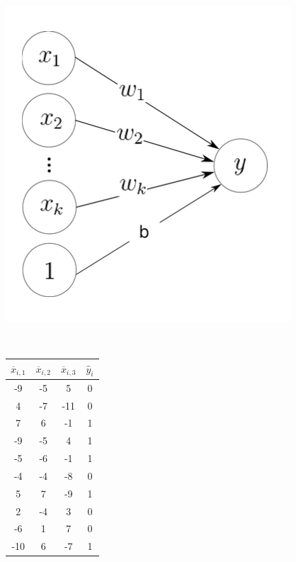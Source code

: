 \documentclass[12pt]{article}
\begin{document}
\begin{figure}[H]
	\begin{minipage}[c]{.49\textwidth}
		\centering
		\includegraphics[width=.7\linewidth]{neuron.png}
		\label{fig:perceptron}
	\end{minipage}
	~
	\begin{minipage}[c]{.49\textwidth}
		\centering
		\begin{tabular}{|c|c|c|c|}
			\hline
			$\overline{x}_{i,1}$ & $\overline{x}_{i,2}$ & $\overline{x}_{i,3}$ & $\hat{y}_i$ \\\hline
			-9         & -5         & 5          & 0                           \\\hline
			4          & -7         & -11        & 0                           \\\hline
			7          & 6          & -1         & 1                           \\\hline
			-9         & -5         & 4          & 1                           \\\hline
			-5         & -6         & -1         & 1                           \\\hline
			-4         & -4         & -8         & 0                           \\\hline
			5          & 7          & -9         & 1                           \\\hline
			2          & -4         & 3          & 0                           \\\hline
			-6         & 1          & 7          & 0                           \\\hline
			-10        & 6          & -7         & 1                           \\\hline
		\end{tabular}
		\label{tab:train-dataset}
	\end{minipage}
\end{figure}
\end{document}
